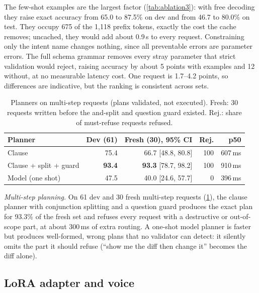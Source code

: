 \documentclass[journal]{IEEEtran}
\theoremstyle{definition}
\begin{document}
The few-shot examples are the largest factor (\cref{tab:ablation3}): with free decoding they raise
exact accuracy from 65.0 to 87.5\% on dev and from 46.7 to 80.0\% on test. They occupy 675 of the
1{,}118 prefix tokens, exactly the cost the cache removes; uncached, they would add about 0.9\,s to
every request. Constraining only the intent name changes nothing, since all preventable errors are
parameter errors. The full schema grammar removes every stray parameter that strict validation would
reject, raising accuracy by about 5 points with examples and 12 without, at no measurable latency
cost. One request is 1.7--4.2 points, so differences are indicative, but the ranking is consistent
across sets.

\begin{table}[t]
\centering\small
\caption{Planners on multi-step requests (plans validated, not executed). Fresh: 30 requests
written before the and-split and question guard existed. Rej.: share of must-refuse requests
refused.}
\label{tab:multistep}
\setlength{\tabcolsep}{3pt}
\setlength{\tabcolsep}{2pt}
\begin{tabular}{@{}lrrrr@{}}
\toprule
Planner & Dev (61) & Fresh (30), 95\% CI & Rej. & p50 \\
\midrule
Clause & 75.4 & 66.7 [48.8, 80.8] & 100 & 607\,ms \\
Clause + split + guard & \textbf{93.4} & \textbf{93.3} [78.7, 98.2] & 100 & 910\,ms \\
Model (one shot) & 47.5 & 40.0 [24.6, 57.7] & 0 & 396\,ms \\
\bottomrule
\end{tabular}
\end{table}

\emph{Multi-step planning.} On 61 dev and 30 fresh multi-step requests (\cref{tab:multistep}), the
clause planner with conjunction splitting and a question guard produces the exact plan for 93.3\% of
the fresh set and refuses every request with a destructive or out-of-scope part, at about 300\,ms of
extra routing. A one-shot model planner is faster but produces well-formed, wrong plans that no
validator can detect: it silently omits the part it should refuse (``show me the diff then change
it'' becomes the diff alone).

\subsection{LoRA adapter and voice}\label{sec:lora}
\end{document}

